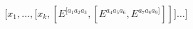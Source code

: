 \begin{equation}\label{Jacobi}
\Big[ x_1, \dots , \big[ x_k , 
[E^{[a_1 a_2 a_3} ,[ E^{a_4 a_5 a_6}, E^{a_7 a_8 a_9]}]] \big] \dots \Big]
\end{equation}

